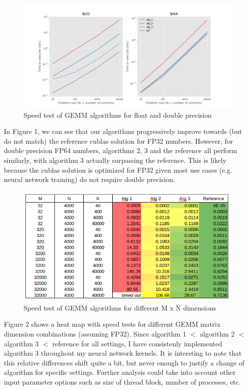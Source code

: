 \documentclass[12pt,letterpaper,twoside]{article}
\begin{document}
\begin{figure}[!htbp]
    \centering
    \includegraphics[scale=0.6]{speed_alg_vs_problem_size.png}
    \caption{Speed test of GEMM algorithms for float and double precision}
\end{figure}

In Figure 1, we can see that our algorithms progressively improve towards 
(but do not match) the reference cublas solution for FP32 numbers. However,
for double precision FP64 numbers, algorithms 2, 3 and the reference all 
perform similarly, with algorithm 3 actually surpassing the reference. 
This is likely because the cublas solution is optimized for FP32 given 
most use cases (e.g. neural network training) do not require double 
precision.

\begin{figure}[!htbp]
    \centering
    \includegraphics[scale=0.7]{speed_alg_vs_dimensions.png}
    \caption{Speed test of GEMM algorithms for different M x N dimensions}
\end{figure}

Figure 2 shows a heat map with speed tests for different GEMM matrix dimension
combinations (assuming FP32). Since algorithm 1 $<$ algorithm 2 $<$ algorithm 3 
$<$ reference for all settings, I have consistenly implemented algorithm 3 
throughout my neural network kernels. It is intersting to note that this 
relative differences shift quite a bit, but never enough to justify 
a change of algorithm for specific settings. Further analysis could take 
into account other input parameter options such as size of thread block,
number of processes, etc.
\end{document}
